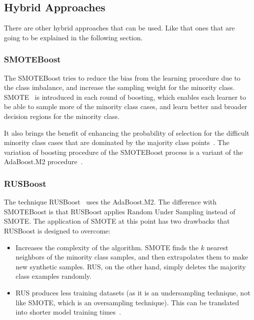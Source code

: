 \subsection{Hybrid Approaches}\label{subsec:hybridApproaches}

There are other hybrid approaches that can be used. Like that ones that
are going to be explained in the following section.

\subsubsection{SMOTEBoost}

The SMOTEBoost tries to reduce the bias from the learning procedure due to 
the class imbalance, and increase the sampling weight for the minority class. 
SMOTE~\cite{CBHK2002} is introduced in each round of boosting, which enables
each learner to be able to sample more of the minority class cases, and
learn better and broader decision regions for the minority class. 

It also brings the benefit of enhancing the probability of selection for 
the difficult minority class cases that are dominated by the majority class 
points~\cite{CLHB2003}. The variation of boosting procedure of the SMOTEBoost
process is a variant of the AdaBoost.M2 procedure~\cite{FS1997}.

\subsubsection{RUSBoost}

The technique RUSBoost~\cite{Seiffert2010} uses the AdaBoost.M2. The 
difference with SMOTEBoost is that RUSBoost applies Random Under Sampling 
instead of SMOTE. The application of SMOTE at this point has two drawbacks that 
RUSBoost is designed to overcome:

\begin{itemize}
    \item Increases the complexity of the algorithm. SMOTE finds the $k$ 
    nearest neighbors of the minority class samples, and then extrapolates
    them to make new synthetic samples. RUS, on the other hand, simply deletes 
    the majority class examples randomly.
    \item RUS produces less training datasets (as it is an undersampling 
    technique, not like SMOTE, which is an oversampling technique). This can
    be translated into shorter model training times~\cite{Seiffert2010}.
\end{itemize}

